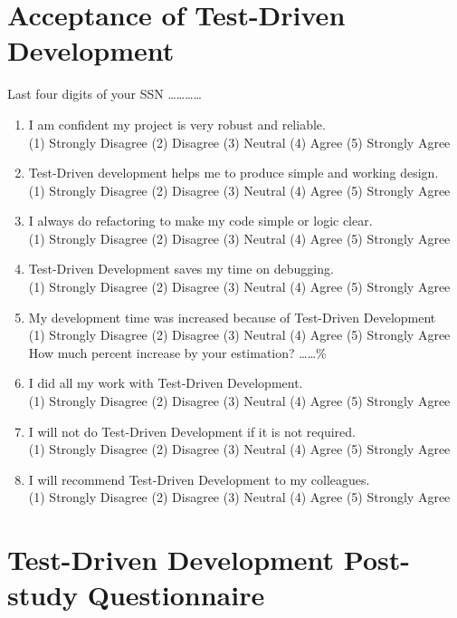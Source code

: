 \appendix
\chapter{Acceptance of Test-Driven Development}


\begin{center}
  Last four digits of your SSN \ldots\ldots\ldots\ldots
\end{center}

\begin{enumerate}
\item I am confident my project is very robust and reliable. \\
(1) Strongly Disagree (2) Disagree (3) Neutral (4) Agree (5) Strongly Agree
\item Test-Driven development helps me to produce simple and working
design.\\
(1) Strongly Disagree (2) Disagree (3) Neutral (4) Agree (5) Strongly Agree
\item I always do refactoring to make my code simple or logic clear. \\
(1) Strongly Disagree (2) Disagree (3) Neutral (4) Agree (5) Strongly Agree
\item Test-Driven Development saves my time on debugging. \\
(1) Strongly Disagree (2) Disagree (3) Neutral (4) Agree (5) Strongly Agree
\item My development time was increased because of Test-Driven Development \\
  (1) Strongly Disagree (2) Disagree (3) Neutral (4) Agree (5) Strongly
  Agree \\ How much percent increase by your estimation? \ldots\ldots  \%
\item I did all my work with Test-Driven Development. \\
(1) Strongly Disagree (2) Disagree (3) Neutral (4) Agree (5) Strongly Agree
\item I will not do Test-Driven Development if it is not required. \\
(1) Strongly Disagree (2) Disagree (3) Neutral (4) Agree (5) Strongly Agree
\item I will recommend Test-Driven Development to my colleagues. \\
(1) Strongly Disagree (2) Disagree (3) Neutral (4) Agree (5) Strongly Agree
\end{enumerate}


\chapter{Test-Driven Development Post-study Questionnaire}

